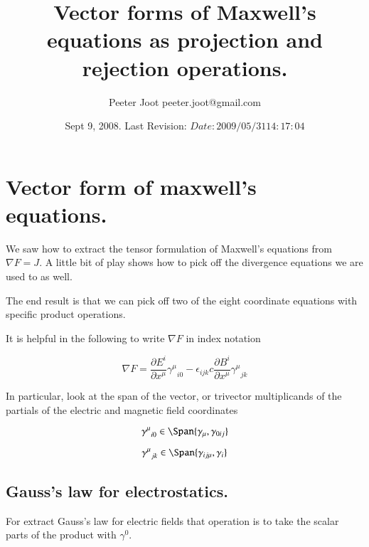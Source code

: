 \documentclass{article}      %
\title{Vector forms of Maxwell's equations as projection and rejection operations.} %
\author{Peeter Joot \quad peeter.joot@gmail.com}         %
\date{ Sept 9, 2008.  Last Revision: $Date: 2009/05/31 14:17:04 $ } %
\newcommand{\grad}[0]{\nabla}
\newcommand{\PD}[2]{\frac{\partial {#2}}{\partial {#1}}}
\begin{document}

\maketitle{}

\tableofcontents

\section{ Vector form of maxwell's equations. }


We saw how to extract the tensor formulation of Maxwell's equations
from $\grad F = J$.  A little bit of play shows how to pick off the divergence
equations we are used to as well.

The end result is that we can pick off two of the eight coordinate equations
with specific product operations.

It is helpful in the following to write $\grad F$ in index notation

\begin{equation}
\grad F = \PD{x^\mu}{E^i} {\gamma^{\mu}}_{i 0} - \epsilon_{i j k} c \PD{x^\mu}{B^i} {\gamma^{\mu}}_{j k}
\end{equation}

In particular, look at the span of the vector, or trivector multiplicands of
the partials of the electric and magnetic field coordinates

\begin{equation}\label{eqn:spanpartialE}
{\gamma^{\mu}}_{i 0} \in \Span \{ \gamma_{\mu}, \gamma_{0 i j} \}
\end{equation}

\begin{equation}\label{eqn:spanpartialB}
{\gamma^{\mu}}_{j k} \in \Span \{ \gamma_{i j \mu}, \gamma_i \}
\end{equation}

\subsection{ Gauss's law for electrostatics. }

For extract Gauss's law for electric fields that operation is to take the scalar
parts of the product with $\gamma^0$.
\end{document}

